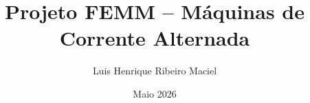 
\title{Projeto FEMM -- Máquinas de Corrente Alternada}                         %
\author{Luis Henrique Ribeiro Maciel}       %
\date{Maio 2026}                           %

\def\uname{Universidade Federal de Minas Gerais} %
\def\depart{Escola de Engenharia}                %
\def\materia{Conversão de Energia}               %
\def\turma{Turma TA}                              %

\makeatletter
\let\thetitle\@title
\let\theauthor\@author
\let\thedate\@date
\makeatother

\usepackage[utf8]{inputenc}   %
\usepackage[brazil]{babel}    %
\usepackage{indentfirst}      %
\usepackage{parskip}          %

\usepackage{amsmath}          %
\usepackage{amssymb}          %
\usepackage{steinmetz}        %
\usepackage{pifont}           %

\usepackage{graphicx}         %
\usepackage{caption}          %
\usepackage{subcaption}       %
\usepackage{float}            %
\usepackage{tikz}             %
\usepackage{enumitem}         %
\usetikzlibrary{shapes.geometric, arrows.meta, positioning}

